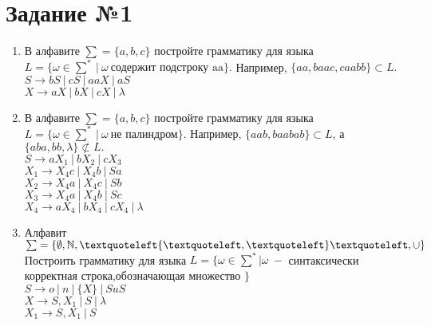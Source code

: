 \documentclass{article}
\begin{document}
    \section*{\huge{Задание №1}}
    
        \begin{enumerate}
            \LARGE
            \item В алфавите $\sum = \{a,b,c\}$ постройте грамматику для языка $L = \{ \omega \in \sum^* \ | 
            \ \omega \ \text{содержит подстроку aa} \}.$ Например, $\{aa, baac, caabb\} \subset L.$ \\
            
                $S \rightarrow bS \ | \ cS \ | \ aaX \ | \ aS $ \\
                $X \rightarrow aX \ | \ bX \ | \ cX \ | \ \lambda$ \\
            
            \item В алфавите $\sum = \{a,b,c\}$ постройте грамматику для языка $L = \{ \omega \in \sum^* \ |
            \ \omega \  \text{не палиндром} \}.$ Например, $\{aab, baabab\} \subset L$, а $\{ aba, bb,
            \lambda \} \not\subset L.$ \\
            
                $S \rightarrow aX_1 \ | \ bX_2 \ | \ cX_3 $  \\
                $X_1 \rightarrow X_4c \ | \ X_4b \ | \ Sa $  \\
                $X_2 \rightarrow X_4a \ | \ X_4c \ | \ Sb $  \\
                $X_3 \rightarrow X_4a \ | \ X_4b \ | \ Sc $  \\
                $X_4 \rightarrow aX_4 \ | \ bX_4 \ | \ cX_4 \ | \ \lambda $  \\
                
            \item Алфавит $\sum = \{ \emptyset, \mathbb{N}, 
            \textquoteleft \{ \textquoteleft , \textquoteleft \}\textquoteleft, \cup \}$ Построить грамматику для языка
            $L = \{ \omega \in \sum^*|\omega \ - $ синтаксически корректная строка,обозначающая множество $\}$ \\
            
                $S \rightarrow o \ | \ n \ | \ \{ X \} \ | \ S u S$ \\
                $X \rightarrow S,X_1 \ | \ S \ | \ \lambda $ \\
                $X_1 \rightarrow S,X_1 \ | \ S$ \\
        \end{enumerate}
        
\end{document}
